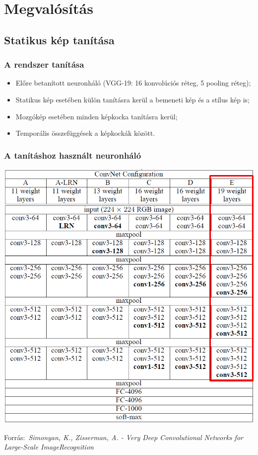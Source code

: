 \documentclass{beamer}
\newcommand{\credit}[1]{\par\hfill \footnotesize \tiny Forrás:~\itshape#1}
\begin{document}
	\section{Megvalósítás}
	\subsection{Statikus kép tanítása}
	
	\begin{frame}
		\frametitle{A rendszer tanítása}
		\begin{itemize}
			\item Előre betanított neuronháló (VGG-19: 16 konvolúciós réteg, 5 pooling réteg);
			\item Statikus kép esetében külön tanításra kerül a bemeneti kép és a stílus kép is;
			\item Mozgókép esetében minden képkocka tanításra kerül;
			\item Temporális összefüggések a képkockák között.
		\end{itemize}
	\end{frame}
	
	\begin{frame}
		\frametitle{A tanításhoz használt neuronháló}
		\begin{center}
			\includegraphics[scale=0.2]{VGG19.png}
			\credit{Simonyan, K., Zisserman, A. - Very Deep Convolutional Networks for Large-Scale ImageRecognition}
		\end{center}
	\end{frame}
\end{document}
